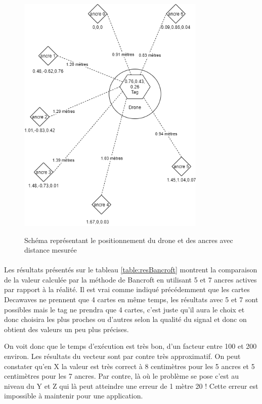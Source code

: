             \begin{figure}[H]
                \centering
            	\begin{frame}{\includegraphics[width=0.8\textwidth]{image/positionnementAncres.png}}
            	\end{frame}
            	\caption{\label{fig:positionAncresTest}Schéma représentant le positionnement du drone et des ancres avec distance mesurée}
            \end{figure}
            
            \paragraph*{}
            Les résultats présentés sur le tableau \ref{table:resBancroft} montrent la comparaison de la valeur calculée par la méthode de Bancroft en utilisant 5 et 7 ancres actives par rapport à la réalité. Il est vrai comme indiqué précédemment que les cartes Decawaves ne prennent que 4 cartes en même temps, les résultats avec 5 et 7 sont possibles mais le tag ne prendra que 4 cartes, c'est juste qu'il aura le choix et donc choisira les plus proches ou d'autres selon la qualité du signal et donc on obtient des valeurs un peu plus précises.
            
            On voit donc que le temps d'exécution est très bon, d'un facteur entre 100 et 200 environ. Les résultats du vecteur sont par contre très approximatif. On peut constater qu'en X la valeur est très correct à 8 centimètres pour les 5 ancres et 5 centimètres pour les 7 ancres. Par contre, là où le problème se pose c'est au niveau du Y et Z qui là peut atteindre une erreur de 1 mètre 20 ! Cette erreur est impossible à maintenir pour une application.
            
